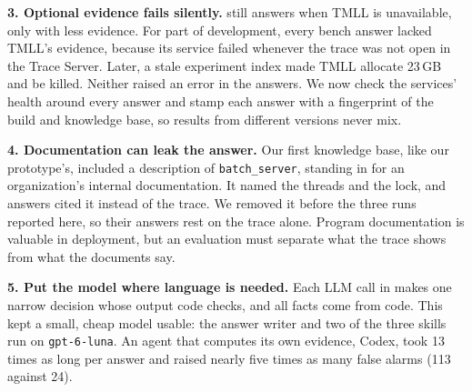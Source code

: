 \textbf{3. Optional evidence fails silently.} \sysname still answers when TMLL is unavailable, only with less evidence. For part of development, every bench answer lacked TMLL's evidence, because its service failed whenever the trace was not open in the Trace Server. Later, a stale experiment index made TMLL allocate 23\,GB and be killed. Neither raised an error in the answers. We now check the services' health around every answer and stamp each answer with a fingerprint of the build and knowledge base, so results from different versions never mix.

\textbf{4. Documentation can leak the answer.} Our first knowledge base, like our prototype's, included a description of \texttt{batch\_server}, standing in for an organization's internal documentation. It named the threads and the lock, and answers cited it instead of the trace. We removed it before the three runs reported here, so their answers rest on the trace alone. Program documentation is valuable in deployment, but an evaluation must separate what the trace shows from what the documents say.

\textbf{5. Put the model where language is needed.} Each LLM call in \sysname makes one narrow decision whose output code checks, and all facts come from code. This kept a small, cheap model usable: the answer writer and two of the three skills run on \texttt{gpt-6-luna}. An agent that computes its own evidence, Codex, took 13 times as long per answer and raised nearly five times as many false alarms (113 against 24).
